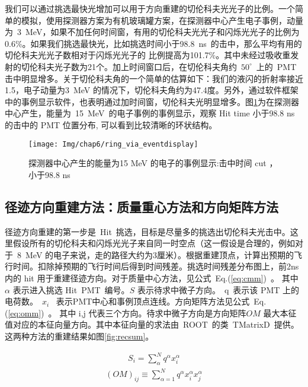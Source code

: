 我们可以通过挑选最快光增加可以用于方向重建的切伦科夫光光子的比例。一个简单的模拟，使用探测器方案为有机玻璃罐方案，在探测器中心产生电子事例，动量为~3~MeV，如果不加任何时间窗，有用的切伦科夫光光子和闪烁光光子的比例为
0.6\%。如果我们挑选最快光，比如挑选时间小于98.8~ns~的击中，那么平均有用的切伦科夫光光子数相对于闪烁光光子的
比例提高为101.7\%。其中未经过吸收重发射的切伦科夫光子数为21个。加上时间窗口后，在切伦科夫角约~$50^{\circ}$~上的~PMT~ 击中明显增多。关于切伦科夫角的一个简单的估算如下：我们的液闪的折射率接近1.5，电子动量为3~MeV 的情况下，切伦科夫角约为47.4度。另外，通过软件框架中的事例显示软件，也表明通过加时间窗，切伦科夫光明显增多。图\ref{fig:p61}为在探测器中心产生，能量为~15~MeV~的电子事例的事例显示，观察 Hit time 小于98.8 ns 的击中的 PMT 位置分布, 可以看到比较清晰的环状结构。
\begin{figure}[!htb]
  \centering
   \texttt{[image: Img/chap6/ring\_via\_eventdisplay]}
    \caption{探测器中心产生的能量为15 MeV 的电子的事例显示:击中时间 cut ，小于98.8 ns }
  \label{fig:p61}
\end{figure}
\subsection{径迹方向重建方法：质量重心方法和方向矩阵方法}
径迹方向重建的第一步是~Hit~挑选，目标是尽量多的挑选出切伦科夫光击中。这里假设所有的切伦科夫和闪烁光光子来自同一时空点（这一假设是合理的，例如对于~8~MeV 的电子来说，走的路径大约为3厘米）。根据重建顶点，计算出预期的飞行时间。扣除掉预期的飞行时间后得到时间残差。挑选时间残差分布图上，前2ns内的 hit 用于重建径迹方向。对于质量中心方法，见公式~Eq.(\ref{eq:cmm})~。 其中$\alpha$ 表示进入挑选 Hit~PMT~编号。$S$ 表示待求中微子方向。~q~表示该 PMT 上的电荷数。~$x_i$~ 表示PMT中心和事例顶点连线。方向矩阵方法见公式~Eq.(\ref{eq:omm})~。 其中 i,j 代表三个方向。待求中微子方向是方向矩阵$OM$ 最大本征值对应的本征向量方向。其中本征向量的求法由~ROOT~的类~TMatrixD~提供。这两种方法的重建结果如图\ref{fig:recsum}。

\begin{equation}\label{eq:cmm}
\begin{split}
S_i = \sum^N_{\alpha} q^{\alpha}x^{\alpha}_i
\end{split}
\end{equation}
\begin{eqnarray}\label{eq:omm}
(OM)_{ij}\equiv \sum_{\alpha=1}^{N} q^{\alpha}x^{\alpha}_i x^{\alpha}_j
\end{eqnarray}

